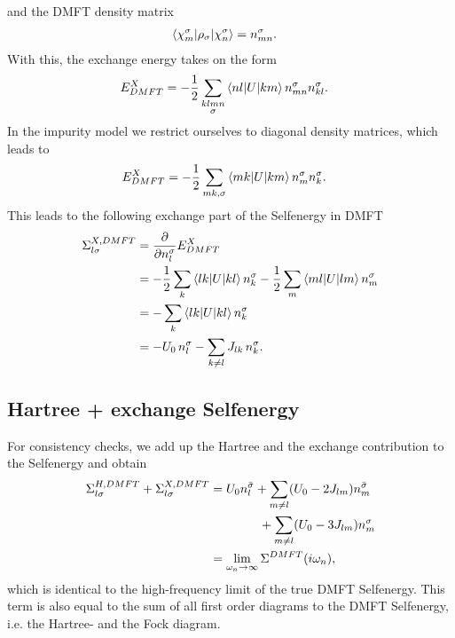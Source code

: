 \documentclass[12pt,a4paper]{scrartcl}
\numberwithin{equation}{section}
\begin{document}
and the DMFT density matrix
\begin{align}
\braket{\chi^{\sigma}_m | \rho_{\sigma} | \chi^{\sigma}_n } 
&= n^{\sigma}_{mn}.
\end{align}
With this, the exchange energy takes on the form
\begin{align}
E^X_{DMFT}
&= -\frac{1}{2} \sum_{\substack{klmn\\\sigma}}\braket{nl|U|km} n^{\sigma}_{mn} n^{\sigma}_{kl}.
\end{align}
In the impurity model we restrict ourselves to diagonal density matrices, which leads to
\begin{align}
E^X_{DMFT}
&= -\frac{1}{2} \sum_{mk,\sigma}\braket{mk|U|km} n^{\sigma}_{m} n^{\sigma}_{k} .
\end{align}
This leads to the following exchange part of the Selfenergy in DMFT
\begin{align}
\Sigma^{X,DMFT}_{l\sigma}
&= \frac{\partial }{\partial n^{\sigma}_l} E^X_{DMFT} \\
%
&= -\frac{1}{2} \sum_{k}\braket{lk|U|kl} n^{\sigma}_{k} 
   -\frac{1}{2} \sum_{m}\braket{ml|U|lm} n^{\sigma}_{m}  \\
%
&= - \sum_{k}\braket{lk|U|kl} n^{\sigma}_{k} \\
%
&= - U_0\, n^{\sigma}_l -  \sum_{k\neq l} J_{lk} \, n^{\sigma}_{k}.
\end{align}

\subsection{Hartree + exchange Selfenergy}
For consistency checks, we add up the Hartree and the exchange contribution
to the Selfenergy and obtain
\begin{align}
\Sigma^{H,DMFT}_{l\sigma} + \Sigma^{X,DMFT}_{l\sigma}
%
&= U_0 n^{\bar{\sigma}}_l 
%
               + \sum_{m\neq l} (U_0-2J_{lm}) n^{\bar{\sigma}}_m  \nonumber \\
& \hspace{1.4cm} + \sum_{m\neq l} (U_0-3J_{lm}) n^{     \sigma }_m  \\
&= \lim_{\omega_n\rightarrow \infty} \Sigma^{DMFT}(i\omega_n),
\end{align}
which is identical to the high-frequency limit of the true DMFT Selfenergy.
This term is also equal to the sum of all first order diagrams to the
DMFT Selfenergy, i.e. the Hartree- and the Fock diagram.
\end{document}
